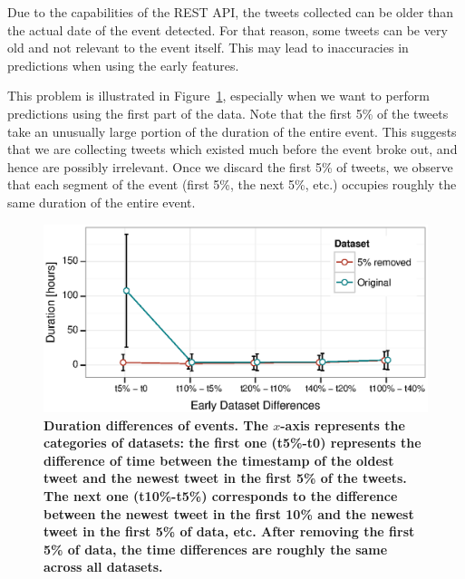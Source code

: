 \documentclass[10pt,letterpaper]{article}
\begin{document}
Due to the capabilities of the REST API, the tweets collected can be
older than the actual date of the event detected. For that reason,
some tweets can be very old and not relevant to the event itself. This
may lead to inaccuracies in predictions when using the early features.

This problem is illustrated in Figure~\ref{fig:duration-differences},
especially when we want to perform predictions using the first part of
the data. Note that the first 5\% of the tweets take an unusually
large portion of the duration of the entire event. This suggests that
we are collecting tweets which existed much before the event broke
out, and hence are possibly irrelevant. Once we discard the first 5\%
of tweets, we observe that each segment of the event (first 5\%, the
next 5\%, etc.) occupies roughly the same duration of the entire event.

\begin{figure}
  \centering
  \includegraphics[width=.7\textwidth]{figures_SI/Plots_from_data/time_differences.eps}
  \caption[Duration differences of events.]{\textbf{Duration
      differences of events. The $x$-axis represents the categories of
      datasets: the first one (t5\%-t0) represents the difference of
      time between the timestamp of the oldest tweet and the newest
      tweet in the first 5\% of the tweets. The next one (t10\%-t5\%)
      corresponds to the difference between the newest tweet in the
      first 10\% and the newest tweet in the first 5\% of data, etc.
      After removing the first 5\% of data, the time differences are
      roughly the same across all datasets.
    }}\label{fig:duration-differences}

\end{figure}
\end{document}
